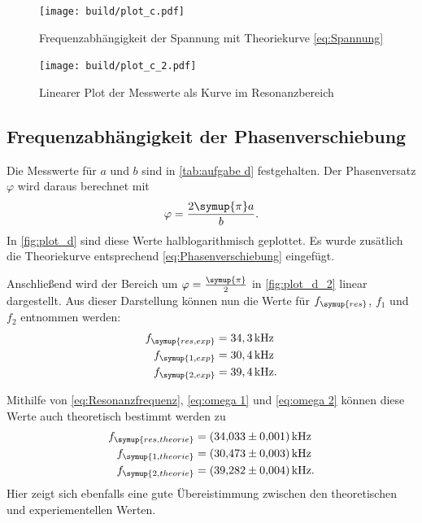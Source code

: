 \begin{figure} [H]
  \centering
  \texttt{[image: build/plot\_c.pdf]}
  \caption{Frequenzabhängigkeit der Spannung mit Theoriekurve \eqref{eq:Spannung}}
  \label{fig:plot_c}
\end{figure}

\begin{figure} [H]
  \centering
  \texttt{[image: build/plot\_c\_2.pdf]}
  \caption{Linearer Plot der Messwerte als Kurve im Resonanzbereich}
  \label{fig:plot_c_2}
\end{figure}

\subsection{Frequenzabhängigkeit der Phasenverschiebung}
\label{sec:Frequenzabhängigkeit der Phasenverschiebung}

Die Messwerte für $a$ und $b$ sind in \autoref{tab:aufgabe d} festgehalten.
Der Phasenversatz $\varphi$ wird daraus berechnet mit
\begin{equation}
  \varphi=\frac{2\symup{\pi} a}{b}.
\end{equation}
In \autoref{fig:plot_d} sind diese Werte halblogarithmisch geplottet.
Es wurde zusätlich die Theoriekurve entsprechend \eqref{eq:Phasenverschiebung} eingefügt.

Anschließend wird der Bereich um $\varphi=\frac{\symup{\pi}}{2}$ in \autoref{fig:plot_d_2} linear dargestellt.
Aus dieser Darstellung können nun die Werte für $f_{\symup{res}}$, $f_{1}$ und $f_{2}$ entnommen werden:
\begin{align*}
  f_{\symup{res, exp}} &= 34,3\,\unit{\kilo\hertz} \\
  f_{\symup{1,exp}} &= 30,4\,\unit{\kilo\hertz} \\
  f_{\symup{2,exp}} &= 39,4\,\unit{\kilo\hertz}.
\end{align*}

Mithilfe von \eqref{eq:Resonanzfrequenz}, \eqref{eq:omega 1} und \eqref{eq:omega 2} können diese Werte auch theoretisch bestimmt werden zu
\begin{align*}
  f_{\symup{res, theorie}} &= \qty{34.033+-0.001}{\kilo\hertz} \\
  f_{\symup{1,theorie}} &= \qty{30.473+-0.003}{\kilo\hertz} \\
  f_{\symup{2,theorie}} &= \qty{39.282+-0.004}{\kilo\hertz}.
\end{align*}
Hier zeigt sich ebenfalls eine gute Übereistimmung zwischen den theoretischen und experiementellen Werten.

